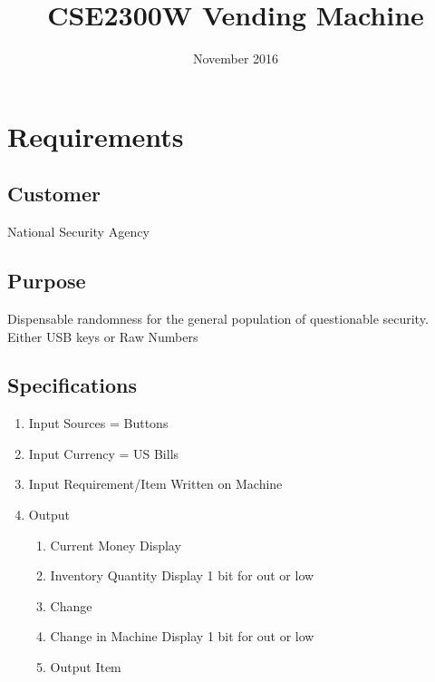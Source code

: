 \documentclass[letterpaper]{article}
\title{CSE2300W Vending Machine}
\author{}
\date{November 2016}
\begin{document}
\maketitle

\section{Requirements}
\subsection{Customer}
National Security Agency
\subsection{Purpose}
Dispensable randomness for the general population of questionable security.
Either USB keys or Raw Numbers
\subsection{Specifications}
\begin{enumerate}
\item Input Sources = Buttons
\item Input Currency = US Bills
\item Input Requirement/Item Written on Machine
\item Output
\begin{enumerate}
\item Current Money Display
\item Inventory Quantity Display 1 bit for out or low
\item Change
\item Change in Machine Display 1 bit for out or low
\item Output Item
\end{enumerate} 
\end{enumerate}
\end{document}

